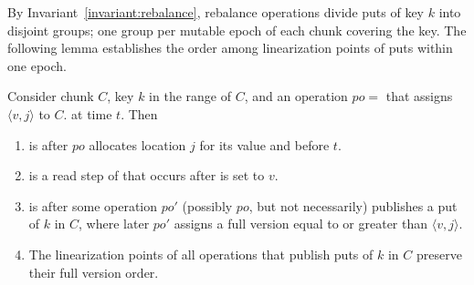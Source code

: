 By Invariant~\ref{invariant:rebalance},
rebalance operations divide puts of key $k$ into disjoint groups; one group per mutable epoch of each chunk covering the key.
The following lemma 
establishes the order among linearization points of puts within one epoch.
\begin{lemma}
\label{proof:put}
Consider chunk $C$, key $k$ in the range of $C$, and an
operation $po=$ that assigns $\langle v, j\rangle$ to $C$. at time $t$. Then  
\begin{enumerate}
\setlength{\itemsep}{0pt}
\setlength{\parskip}{0pt}
\item \label{proof:put:lp1}  is after $po$ allocates location $j$ for its value and before $t$.
\item \label{proof:put:lp2}  is a read step of  that occurs after  is set to $v$.
\item \label{proof:put:lp3}  is after some operation $po'$ (possibly $po$, but not necessarily) publishes a put of $k$ in $C$, where later $po'$ assigns a full version equal to or greater than $\langle v, j\rangle$.
\item \label{proof:put:lp4} The linearization points of all operations that publish puts of $k$ in $C$ preserve their full version order.
\end{enumerate}
\end{lemma}
